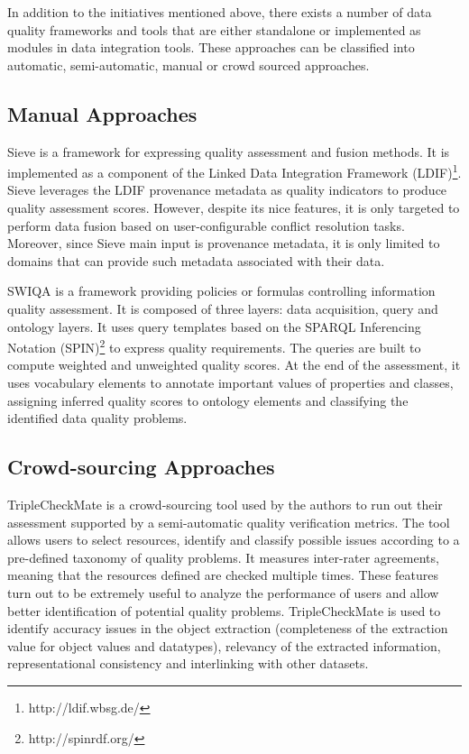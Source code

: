 \documentclass[onecolumn, crcready]{iosart2c}
\begin{document}
In addition to the initiatives mentioned above, there exists a number of data quality frameworks and tools that are either standalone or implemented as modules in data integration tools. These approaches can be classified into automatic, semi-automatic, manual or crowd sourced approaches.

\subsection{Manual Approaches}

Sieve \cite{Mendes2012} is a framework for expressing quality assessment and fusion methods. It is implemented as a component of the Linked Data Integration Framework (LDIF)\footnote{http://ldif.wbsg.de/}. Sieve leverages the LDIF provenance metadata as quality indicators to produce quality assessment scores. However, despite its nice features, it is only targeted to perform data fusion based on user-configurable conflict resolution tasks. Moreover, since Sieve main input is provenance metadata, it is only limited to domains that can provide such metadata associated with their data.

SWIQA \cite{Furber2011a} is a framework providing policies or formulas controlling information quality assessment. It is composed of three layers: data acquisition, query and ontology layers. It uses query templates based on the SPARQL Inferencing Notation (SPIN)\footnote{http://spinrdf.org/} to express quality requirements. The queries are built to compute weighted and unweighted quality scores. At the end of the assessment, it uses vocabulary elements to annotate important values of properties and classes, assigning inferred quality scores to ontology elements and classifying the identified data quality problems.

\subsection{Crowd-sourcing Approaches}

TripleCheckMate \cite{Kontokostas2013} is a crowd-sourcing tool used by the authors to run out their assessment supported by a semi-automatic quality verification metrics. The tool allows users to select resources, identify and classify possible issues according to a pre-defined taxonomy of quality problems. It measures inter-rater agreements, meaning that the resources defined are checked multiple times. These features turn out to be extremely useful to analyze the performance of users and allow better identification of potential quality problems. TripleCheckMate is used to identify accuracy issues in the object extraction (completeness of the extraction value for object values and datatypes), relevancy of the extracted information, representational consistency and interlinking with other datasets.
\end{document}
